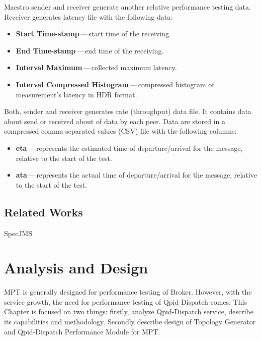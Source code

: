 Maestro sender and receiver generate another relative performance testing data. Receiver generates latency file with the following data:

\begin{itemize}
	\setlength\itemsep{0em}
	\item \textbf{Start Time-stamp}\,---\,start time of the receiving.
	\item \textbf{End Time-stamp}\,---\,end time of the receiving.
	\item \textbf{Interval Maximum}\,---\,collected maximum latency.
	\item \textbf{Interval Compressed Histogram}\,---\,compressed histogram of measurement's latency in HDR\footnotemark{} format.			
\end{itemize}

Both, sender and receiver generates rate (throughput) data file. It contains data about send or received about of data by each peer. Data are stored in a compressed comma-separated values (CSV) file with the following columns:

\begin{itemize}
	\setlength\itemsep{0em}
	\item \textbf{eta}\,---\,represents the estimated time of departure/arrival for the message, relative to the start of the test.
	\item \textbf{ata}\,---\,represents the actual time of departure/arrival for the message, relative to the start of the test.
\end{itemize}


\section{Related Works}
\label{Related Works}
SpecJMS

\chapter{Analysis and Design}
\label{Analysis and Design}
MPT is generally designed for performance testing of Broker. However, with the service growth, the need for performance testing of Qpid-Dispatch comes. This Chapter is focused on two things: firstly, analyze Qpid-Dispatch service, describe its capabilities and methodology. Secondly describe design of Topology Generator and Qpid-Dispatch Performance Module for MPT.

